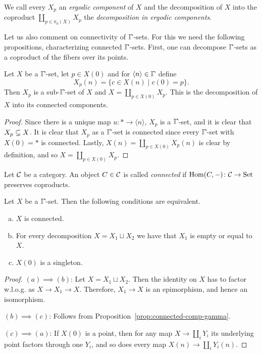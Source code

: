 We call every $X_p$ an \emph{ergodic component} of $X$
and the decomposition of $X$ into the coproduct $\coprod_{p\in\pi_0(X)}X_p$ the
\emph{decomposition in ergodic components}.

Let us also comment on connectivity of $\bbGamma$-sets.
For this we need the following propositions, characterizing connected $\bbGamma$-sets.
First, one can decompose $\bbGamma$-sets as a coproduct of the fibers over its points.

\begin{proposition}\label{prop:connected-comp-gamma}
Let $X$ be a $\bbGamma$-set, let $p\in X(0)$ and for $\langle n\rangle\in\bbGamma$ define
\[
    X_p(n) = \{ c\in X(n) \mid c(0) = p \}.
\]
Then $X_p$ is a sub-$\bbGamma$-set of $X$ and $X = \coprod_{p\in X(0)} X_p$.
This is the decomposition of $X$ into its connected components.
\end{proposition}

\begin{proof}
Since there is a unique map $u\colon\ast\to\langle n\rangle$, $X_p$ is a $\bbGamma$-set, and it is clear that $X_p\subseteq X$.
It is clear that $X_p$ as a $\bbGamma$-set is connected since every $\bbGamma$-set with $X(0) = \ast$ is connected.
Lastly, $X(n) = \coprod_{p\in X(0)} X_p(n)$ is clear by definition, and so $X = \coprod_{p\in X(0)} X_p$.
\end{proof}

\begin{definition}
Let $\mathcal{C}$ be a category.
An object $C\in\mathcal{C}$ is called \emph{connected} if $\operatorname{Hom}(C,-)\colon\mathcal{C}\to\mathrm{Set}$ preserves coproducts.
\end{definition}

\begin{proposition}\label{prop:connected-gamma-prop}
Let $X$ be a $\bbGamma$-set.
Then the following conditions are equivalent.
\begin{enumerate}[(a)]
    \item $X$ is connected.
    \item For every decomposition $X = X_1\sqcup X_2$ we have that $X_1$ is empty or equal to $X$.
    \item $X(0)$ is a singleton.
\end{enumerate}
\end{proposition}

\begin{proof}
$(a)\implies(b)$: Let $X = X_1\sqcup X_2$.
Then the identity on $X$ has to factor w.l.o.g. as $X\to X_1\to X$.
Therefore, $X_1\to X$ is an epimorphism, and hence an isomorphism.

$(b)\implies(c)$: Follows from Proposition~\ref{prop:connected-comp-gamma}.

$(c)\implies(a)$: If $X(0)$ is a point, then for any map $X\to\coprod_i Y_i$
its underlying point factors through one $Y_i$,
and so does every map $X(n)\to\coprod_i Y_i(n)$.
\end{proof}

